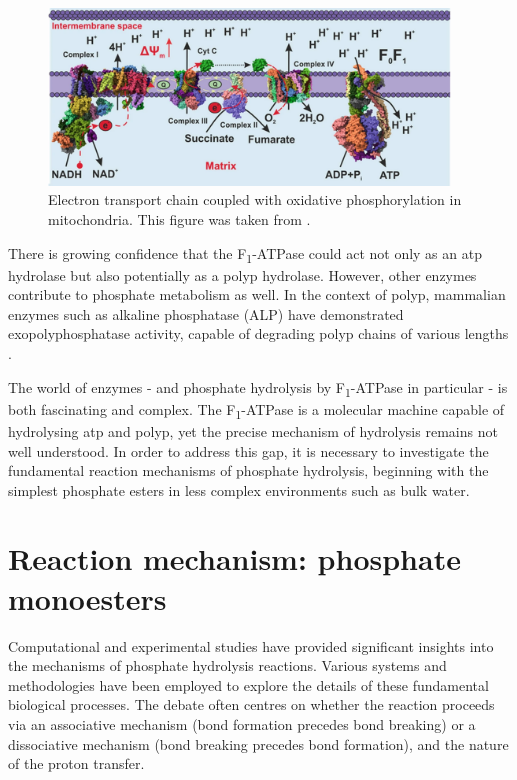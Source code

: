 \begin{figure}[t!]
    \centering
    \includegraphics[width=0.95\textwidth]{Figures/1_Introduction/intro_atp_synthase.pdf}
    \caption{Electron transport chain coupled with oxidative phosphorylation in mitochondria. This figure was taken from \citep{baevInorganicPolyphosphateF0F1ATP2022}.}
    \label{fig:atp_synthase}
\end{figure}

There is growing confidence that the F\textsubscript{1}-ATPase could act not only as an \ac{atp} hydrolase but also potentially as a \ac{polyp} hydrolase. However, other enzymes contribute to phosphate metabolism as well. In the context of \ac{polyp}, mammalian enzymes such as alkaline phosphatase (ALP) have demonstrated exopolyphosphatase activity, capable of degrading \ac{polyp} chains of various lengths \citep{baevInorganicPolyphosphateF0F1ATP2022}.

The world of enzymes - and phosphate hydrolysis by F\textsubscript{1}-ATPase in particular - is both fascinating and complex. The F\textsubscript{1}-ATPase is a molecular machine capable of hydrolysing \ac{atp} and \ac{polyp}, yet the precise mechanism of hydrolysis remains not well understood. In order to address this gap, it is necessary to investigate the fundamental reaction mechanisms of phosphate hydrolysis, beginning with the simplest phosphate esters in less complex environments such as bulk water.



\section{Reaction mechanism: phosphate monoesters}
Computational and experimental studies have provided significant insights into the mechanisms of phosphate hydrolysis reactions. Various systems and methodologies have been employed to explore the details of these fundamental biological processes. The debate often centres on whether the reaction proceeds via an associative mechanism (bond formation precedes bond breaking) or a dissociative mechanism (bond breaking precedes bond formation), and the nature of the proton transfer.



